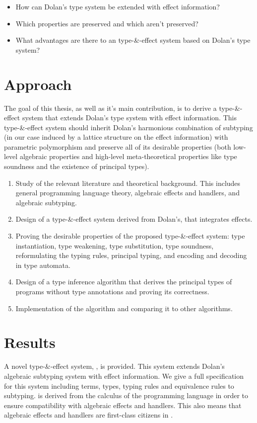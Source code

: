 \begin{itemize}
\item How can Dolan's type system be extended with effect information?
\item Which properties are preserved and which aren't preserved?
\item What advantages are there to an type-\&-effect system based on Dolan's type system?
\end{itemize}

\section{Approach}
The goal of this thesis, as well as it's main contribution, is to derive a type-\&-effect system that extends Dolan's type system with effect information. This type-\&-effect system should inherit Dolan's harmonious combination of subtyping (in our case induced by a lattice structure on the effect information) with parametric polymorphism and preserve all of its desirable properties (both low-level algebraic properties and high-level meta-theoretical properties like type soundness and the existence of principal types). 

\begin{enumerate}
\item Study of the relevant literature and theoretical background. This includes general programming language theory, algebraic effects and handlers, and algebraic subtyping.
\item Design of a type-\&-effect system derived from Dolan's, that integrates effects.
\item Proving the desirable properties of the proposed type-\&-effect system: type instantiation, type weakening, type substitution, type soundness, reformulating the typing rules, principal typing, and encoding and decoding in type automata.
\item Design of a type inference algorithm that derives the principal types of programs without type annotations and proving its correctness. 
\item Implementation of the algorithm and comparing it to other algorithms.
\end{enumerate}

\section{Results}
A novel type-\&-effect system, \core, is provided. This system extends Dolan's algebraic subtyping system with effect information. We give a full specification for this system including terms, types, typing rules and equivalence rules to subtyping. \core is derived from the calculus of the \eff programming language in order to ensure compatibility with algebraic effects and handlers. This also means that algebraic effects and handlers are first-class citizens in \core.

